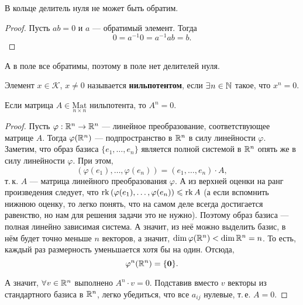 \begin{lemma}
    В кольце делитель нуля не может быть обратим.
\end{lemma}

\begin{proof}
    Пусть $ab = 0$ и $a$ --- обратимый элемент. Тогда
    $$
    0 = a^{-1}0 = a^{-1}ab = b.
    $$
\end{proof}

\begin{remark}
    А в поле все обратимы, поэтому в поле нет делителей нуля.
\end{remark}

\begin{definition}
    Элемент $x \in \mathcal{K}$, $x \ne 0$ называется \textbf{нильпотентом}, если $\exists\!\:n \in \mathbb{N}$ такое, что $x^n = 0$.
\end{definition}

\begin{statement}
    Если матрица $A \in \underset{n \times n}{\mathrm{Mat}}$ нильпотента, то $A^n = 0$.
\end{statement}

\begin{proof}
    Пусть $\varphi: \mathbb{R}^n \rightarrow \mathbb{R}^n$ --- линейное преобразование, соответствующее матрице $A$. Тогда $\varphi(\mathbb{R}^n)$ --- подпространство в $\mathbb{R}^n$ в силу линейности $\varphi$. Заметим, что образ базиса $\{e_1, \ldots, e_n\}$ является полной системой в $\mathbb{R}^n$ опять же в силу линейности $\varphi$. При этом,
    $$
    (\varphi(e_1), \ldots, \varphi(e_n)) = (e_1, \ldots, e_n) \cdot A,
    $$
    т.\,к. $A$ --- матрица линейного преобразования $\varphi$. А из верхней оценки на ранг произведения следует, что $\mathrm{rk}\,(\varphi(e_1), \ldots, \varphi(e_n)) \leqslant \mathrm{rk}\, A$ (а если вспомнить нижнюю оценку, то легко понять, что на самом деле всегда достигается равенство, но нам для решения задачи это не нужно). Поэтому образ базиса --- полная линейно зависимая система. А значит, из неё можно выделить базис, в нём будет точно меньше $n$ векторов, а значит, $\dim\varphi(\mathbb{R}^n) < \dim \mathbb{R}^n = n$. То есть, каждый раз размерность уменьшается хотя бы на один. Отсюда,
    $$
    \varphi^n(\mathbb{R}^n) = \{\boldsymbol{0}\}.
    $$

    А значит, $\forall\!\:v \in \mathbb{R}^n$ выполнено $A^n\cdot v = 0$. Подставив вместо $v$ векторы из стандартного базиса в $\mathbb{R}^n$, легко убедиться, что все $a_{ij}$ нулевые, т.\,е. $A = 0$.
\end{proof}

